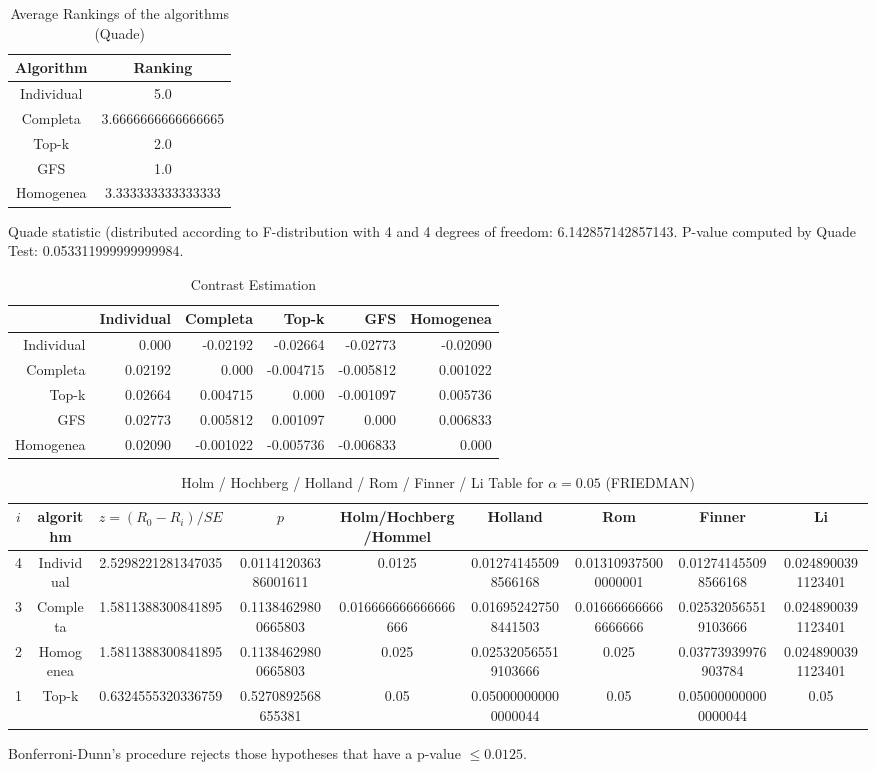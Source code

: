 \documentclass[a4paper,10pt]{article}
\begin{document}
\begin{landscape}
\newpage

\begin{table}[!htp]
\centering
\caption{Average Rankings of the algorithms (Quade)
}\begin{tabular}{c|c}
Algorithm&Ranking\\
\hline
Individual&5.0\\
Completa&3.6666666666666665\\
Top-k&2.0\\
GFS&1.0\\
Homogenea&3.333333333333333\\
\end{tabular}
\end{table}
Quade statistic (distributed according to F-distribution with 4 and 4 degrees of freedom: 6.142857142857143. 
P-value computed by Quade Test: 0.053311999999999984.\newline


\newpage

\begin{table}[!htp]
\centering\tiny
\caption{Contrast Estimation}
\begin{tabular}{
|r|r|r|r|r|r|}
\hline
 &Individual&Completa&Top-k&GFS&Homogenea\\
\hline
Individual&0.000&-0.02192&-0.02664&-0.02773&-0.02090\\
\hline
Completa&0.02192&0.000&-0.004715&-0.005812&0.001022\\
\hline
Top-k&0.02664&0.004715&0.000&-0.001097&0.005736\\
\hline
GFS&0.02773&0.005812&0.001097&0.000&0.006833\\
\hline
Homogenea&0.02090&-0.001022&-0.005736&-0.006833&0.000\\
\hline

\end{tabular}
\end{table}

\newpage

\begin{table}[!htp]
\centering\scriptsize
\caption{Holm / Hochberg / Holland / Rom / Finner / Li Table for $\alpha=0.05$ (FRIEDMAN)}
\begin{tabular}{ccccccccc}
$i$&algorithm&$z=(R_0 - R_i)/SE$&$p$&Holm/Hochberg/Hommel&Holland&Rom&Finner&Li\\
\hline
4&Individual&2.5298221281347035&0.011412036386001611&0.0125&0.012741455098566168&0.013109375000000001&0.012741455098566168&0.0248900391123401\\
3&Completa&1.5811388300841895&0.11384629800665803&0.016666666666666666&0.016952427508441503&0.016666666666666666&0.025320565519103666&0.0248900391123401\\
2&Homogenea&1.5811388300841895&0.11384629800665803&0.025&0.025320565519103666&0.025&0.03773939976903784&0.0248900391123401\\
1&Top-k&0.6324555320336759&0.5270892568655381&0.05&0.050000000000000044&0.05&0.050000000000000044&0.05\\
\hline
\end{tabular}
\end{table}
Bonferroni-Dunn's procedure rejects those hypotheses that have a p-value $\le0.0125$.



\end{landscape}
\end{document}
